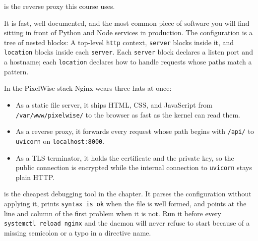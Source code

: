  is the reverse proxy this course uses.

It is fast, well documented, and the most common piece of software you
will find sitting in front of Python and Node services in production.
The configuration is a tree of nested blocks: A top-level \texttt{http}
context, \texttt{server} blocks inside it, and \texttt{location} blocks
inside each \texttt{server}.
Each \texttt{server} block declares a listen port and a hostname; each
\texttt{location} declares how to handle requests whose paths match a
pattern.

In the PixelWise stack Nginx wears three hats at once:
\begin{itemize}
    \item As a static file server, it ships HTML, CSS, and JavaScript
    from \texttt{/var/www/pixelwise/} to the browser as fast as the
    kernel can read them.
    \item As a reverse proxy, it forwards every request whose path
    begins with \texttt{/api/} to \texttt{uvicorn} on
    \texttt{localhost:8000}.
    \item As a TLS terminator, it holds the certificate and the private
    key, so the public connection is encrypted while the internal
    connection to \texttt{uvicorn} stays plain HTTP.
\end{itemize}



 is the cheapest debugging tool in the
chapter.
It parses the configuration without applying it, prints \texttt{syntax
is ok} when the file is well formed, and points at the line and column
of the first problem when it is not.
Run it before every \texttt{systemctl reload nginx} and the daemon will
never refuse to start because of a missing semicolon or a typo in a
directive name.







